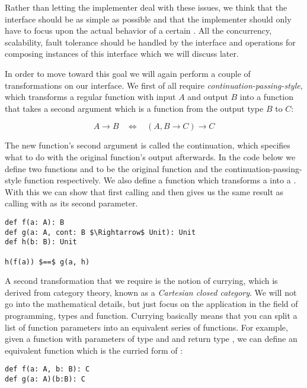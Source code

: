 Rather than letting the implementer deal with these issues, we think that the interface should be as simple as possible and that the implementer should only have to focus upon the actual behavior of a certain \comp. All the concurrency, scalability, fault tolerance should be handled by the interface and operations for composing instances of this interface which we will discuss later.

In order to move toward this goal we will again perform a couple of transformations on our \comp interface. We first of all require \textit{continuation-passing-style}, which transforms a regular function with input $A$ and output $B$ into a function that takes a second argument which is a function from the output type $B$ to $C$:

\[A \rightarrow B \ \ \ \ \Leftrightarrow \ \ \ \ (A, B \rightarrow C) \rightarrow C\]

The new function's second argument is called the continuation, which specifies what to do with the original function's output afterwards. In the code below we define two functions  and  to be the original function and the continuation-passing-style function respectively. We also define a function  which transforms a  into a . With this we can show that first calling  and then  gives us the same result as calling  with  as its second parameter.

\begin{lstlisting}[style=InlineScalaStyle]
def f(a: A): B
def g(a: A, cont: B $\Rightarrow$ Unit): Unit
def h(b: B): Unit

h(f(a)) $==$ g(a, h)
\end{lstlisting}

A second transformation that we require is the notion of currying, which is derived from category theory, known as a \textit{Cartesian closed category}. We will not go into the mathematical details, but just focus on the application in the field of programming, types and function. Currying basically means that you can split a list of function parameters into an equivalent series of functions. For example, given a function  with parameters of type  and  and return type , we can define an equivalent function  which is the curried form of :

\begin{lstlisting}[style=InlineScalaStyle]
def f(a: A, b: B): C
def g(a: A)(b:B): C
\end{lstlisting}

